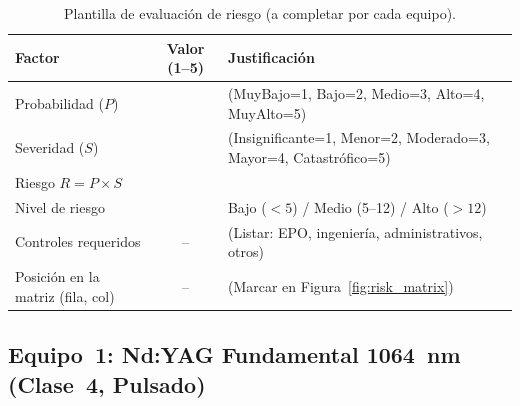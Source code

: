 \documentclass[12pt,a4paper]{article}
\begin{document}
\begin{table}[H]
	\centering
	\caption{Plantilla de evaluación de riesgo (a completar por cada equipo).}
	\label{tab:risk_template}
	\small
	\begin{tabularx}{\textwidth}{l c X}
		\toprule
		\textbf{Factor}                   & \textbf{Valor (1--5)} & \textbf{Justificación}                                           \\
		\midrule
		Probabilidad ($P$)                &                       & (MuyBajo=1, Bajo=2, Medio=3, Alto=4, MuyAlto=5)                  \\
		Severidad ($S$)                   &                       & (Insignificante=1, Menor=2, Moderado=3, Mayor=4, Catastrófico=5) \\
		\midrule
		Riesgo $R = P \times S$           &                       &                                                                  \\
		Nivel de riesgo                   &                       & Bajo ($<5$) / Medio (5--12) / Alto ($>12$)                       \\
		\midrule
		Controles requeridos              & {--}                  & (Listar: EPO, ingeniería, administrativos, otros)                \\
		Posición en la matriz (fila, col) & {--}                  & (Marcar en Figura~\ref{fig:risk_matrix})                         \\
		\bottomrule
	\end{tabularx}
\end{table}

\subsection{Equipo~1: Nd:YAG Fundamental 1064~nm (Clase~4, Pulsado)}
\label{sec:eq1}
\end{document}
